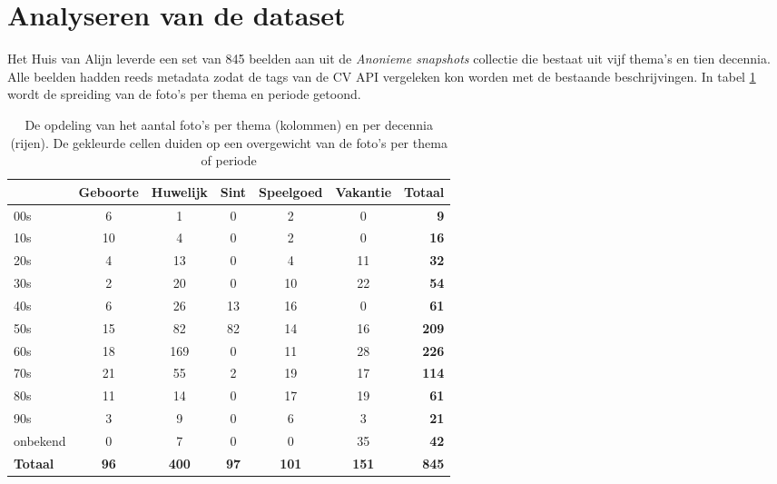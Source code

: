 \section{Analyseren van de dataset}
\label{sec:analyseren-van-de-dataset}

Het Huis van Alijn leverde een set van 845 beelden aan uit de \textit{Anonieme snapshots} collectie die bestaat uit vijf thema’s en tien decennia. Alle beelden hadden reeds metadata zodat de tags van de CV API vergeleken kon worden met de bestaande beschrijvingen. In tabel  \ref{tab:analyse-dataset} wordt de spreiding van de foto’s per thema en periode getoond.

\begin{table}

	\begin{tabular}{l|ccccc|r}
		\toprule
		& Geboorte & Huwelijk & Sint & Speelgoed & Vakantie & Totaal \\
		\midrule
		00s & 6 & 1 & 0 &2 & 0 & \textbf{9} \\
		10s & 10 & 4 & 0 & 2 & 0 & \textbf{16} \\
		20s & 4 & 13 & 0 & 4 & 11 & \textbf{32} \\
		30s & 2 & 20 & 0 & 10 & 22 & \textbf{54} \\
		40s & 6 & 26 & 13 & 16 & 0 & \textbf{61} \\
		50s & 15 & 82 & 82 & 14 & 16 & \textbf{209} \\
		60s & 18 & 169 & 0 & 11 & 28 & \textbf{226} \\
		70s & 21 & 55 & 2 & 19 & 17 & \textbf{114} \\
		80s & 11 & 14 & 0 & 17 & 19 & \textbf{61} \\
		90s & 3 & 9 & 0 & 6 & 3 & \textbf{21} \\
		onbekend & 0 & 7 & 0 & 0 & 35 & \textbf{42} \\
		\midrule
		\textbf{Totaal} & \textbf{96} & \textbf{400} & \textbf{97} & \textbf{101} & \textbf{151} & \textbf{845} \\
		\bottomrule
	\end{tabular}
	\caption[opdeling van het aantal foto’s per thema en decennia]{De opdeling van het aantal foto’s per thema (kolommen) en per decennia (rijen). De gekleurde cellen duiden op een overgewicht van de foto’s per thema of periode}
	\label{tab:analyse-dataset}
\end{table}

